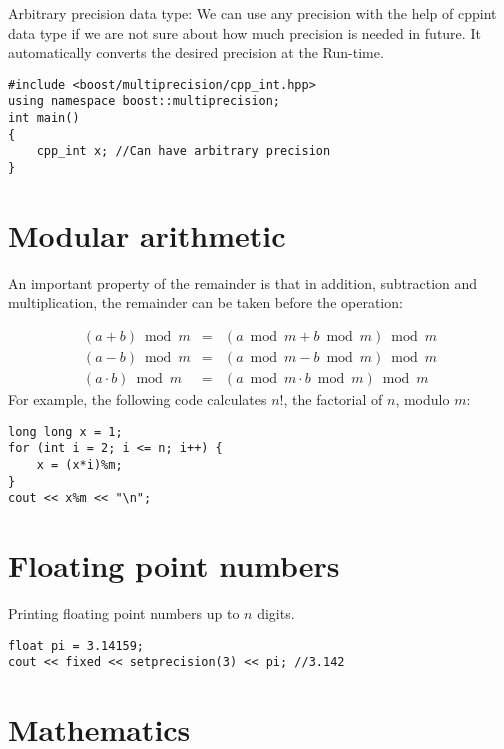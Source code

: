 \documentclass[twoside,12pt,a4paper,english]{book}
\theoremstyle{definition}
\theoremstyle{problemstyle}
\begin{document}
Arbitrary precision data type: We can use any precision with the help of cppint data type if we are not sure about how much precision is needed in future. It automatically converts the desired precision at the Run-time.

\begin{lstlisting}
#include <boost/multiprecision/cpp_int.hpp>
using namespace boost::multiprecision;
int main()
{
    cpp_int x; //Can have arbitrary precision
}
\end{lstlisting}

\section{Modular arithmetic}

An important property of the remainder is that
in addition, subtraction and multiplication,
the remainder can be taken before the operation:

\[
\begin{array}{rcr}
(a+b) \bmod m & = & (a \bmod m + b \bmod m) \bmod m \\
(a-b) \bmod m & = & (a \bmod m - b \bmod m) \bmod m \\
(a \cdot b) \bmod m & = & (a \bmod m \cdot b \bmod m) \bmod m
\end{array}
\]
\linebreak
\linebreak
\linebreak
\linebreak
For example, the following code calculates $n!$,
the factorial of $n$, modulo $m$:
\begin{lstlisting}
long long x = 1;
for (int i = 2; i <= n; i++) {
    x = (x*i)%m;
}
cout << x%m << "\n";
\end{lstlisting}

\section{Floating point numbers}

Printing floating point numbers up to $n$ digits.

\begin{lstlisting}
float pi = 3.14159;
cout << fixed << setprecision(3) << pi; //3.142
\end{lstlisting}


\section{Mathematics}
\end{document}
